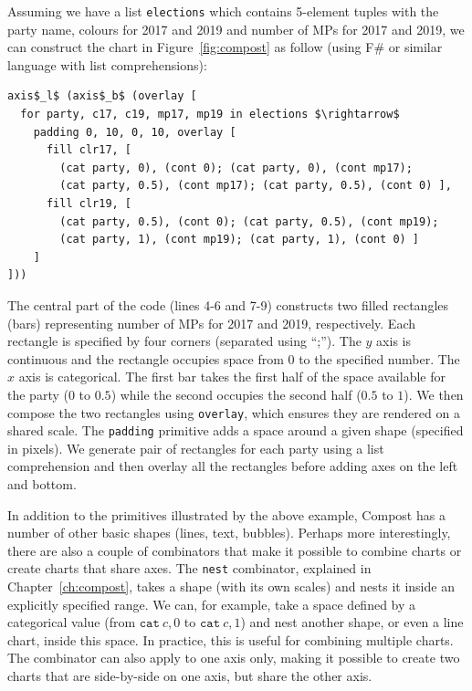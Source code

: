 \documentclass[fleqn,11pt]{report}
\theoremstyle{definition}
\begin{document}
Assuming we have a list \texttt{elections} which contains 5-element tuples with the party name,
colours for 2017 and 2019 and number of MPs for 2017 and 2019, we can construct the chart in
Figure~\ref{fig:compost} as follow (using F\# or similar language with list comprehensions):

\begin{lstlisting}[language=sharp,mathescape=true]
axis$_l$ (axis$_b$ (overlay [
  for party, c17, c19, mp17, mp19 in elections $\rightarrow$
    padding 0, 10, 0, 10, overlay [
      fill clr17, [
        (cat party, 0), (cont 0); (cat party, 0), (cont mp17);
        (cat party, 0.5), (cont mp17); (cat party, 0.5), (cont 0) ],
      fill clr19, [
        (cat party, 0.5), (cont 0); (cat party, 0.5), (cont mp19);
        (cat party, 1), (cont mp19); (cat party, 1), (cont 0) ]
    ]
]))
\end{lstlisting}

\noindent
The central part of the code (lines 4-6 and 7-9) constructs two filled rectangles (bars)
representing number of MPs for 2017 and 2019, respectively. Each rectangle is specified
by four corners (separated using ``;''). The $y$ axis is continuous and the rectangle occupies
space from 0 to the specified number. The $x$ axis is categorical. The first bar takes the
first half of the space available for the party ($0$ to $0.5$) while the second occupies the
second half ($0.5$ to $1$). We then compose the two rectangles using \texttt{overlay}, which
ensures they are rendered on a shared scale. The \texttt{padding} primitive adds a space around
a given shape (specified in pixels). We generate pair of rectangles for each party using a
list comprehension and then overlay all the rectangles before adding axes on the left and bottom.

In addition to the primitives illustrated by the above example, Compost has a number of
other basic shapes (lines, text, bubbles). Perhaps more interestingly, there are also a couple of
combinators that make it possible to combine charts or create charts that share axes.
The \texttt{nest} combinator, explained in Chapter~\ref{ch:compost}, takes a shape (with its own
scales) and nests it inside an explicitly specified range. We can, for example, take a space
defined by a categorical value (from $\texttt{cat}~c, 0$ to $\texttt{cat}~c, 1$) and nest
another shape, or even a line chart, inside this space. In practice, this is useful for combining
multiple charts. The combinator can also apply to one axis only, making it possible to create
two charts that are side-by-side on one axis, but share the other axis.
\end{document}
